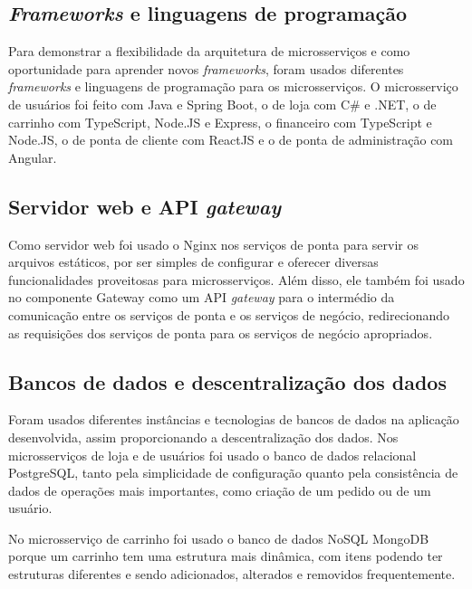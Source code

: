 \subsection{\emph{Frameworks} e linguagens de programação}
Para demonstrar a flexibilidade da arquitetura de microsserviços e como oportunidade para aprender novos \emph{frameworks}, foram usados diferentes \emph{frameworks} e linguagens de programação para os microsserviços. O microsserviço de usuários foi feito com Java e Spring Boot, o de loja com C\# e .NET, o de carrinho com TypeScript, Node.JS e Express, o financeiro com TypeScript e Node.JS, o de ponta de cliente com ReactJS e o de ponta de administração com Angular.

\subsection{Servidor web e API \emph{gateway}}
Como servidor web foi usado o Nginx nos serviços de ponta para servir os arquivos estáticos, por ser simples de configurar e oferecer diversas funcionalidades proveitosas para microsserviços. Além disso, ele também foi usado no componente Gateway como um API \emph{gateway} para o intermédio da comunicação entre os serviços de ponta e os serviços de negócio, redirecionando as requisições dos serviços de ponta para os serviços de negócio apropriados.

\subsection{Bancos de dados e descentralização dos dados}
Foram usados diferentes instâncias e tecnologias de bancos de dados na aplicação desenvolvida, assim proporcionando a descentralização dos dados. Nos microsserviços de loja e de usuários foi usado o banco de dados relacional PostgreSQL, tanto pela simplicidade de configuração quanto pela consistência de dados de operações mais importantes, como criação de um pedido ou de um usuário.

No microsserviço de carrinho foi usado o banco de dados NoSQL MongoDB porque um carrinho tem uma estrutura mais dinâmica, com itens podendo ter estruturas diferentes e sendo adicionados, alterados e removidos frequentemente. 

